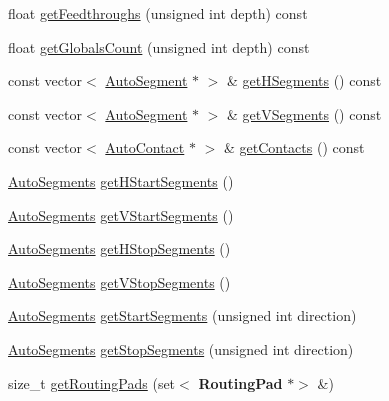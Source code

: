 \begin{DoxyCompactItemize}
float \hyperlink{classKatabatic_1_1GCell_a14feed45699c8dc406251519dc08bc79}{get\+Feedthroughs} (unsigned int depth) const
\item 
float \hyperlink{classKatabatic_1_1GCell_a4785bcc49da76fc38f6940f5b1cc5b17}{get\+Globals\+Count} (unsigned int depth) const
\item 
const vector$<$ \hyperlink{classKatabatic_1_1AutoSegment}{Auto\+Segment} $\ast$ $>$ \& \hyperlink{classKatabatic_1_1GCell_a81575302a8794958c310dc101807e9c5}{get\+H\+Segments} () const
\item 
const vector$<$ \hyperlink{classKatabatic_1_1AutoSegment}{Auto\+Segment} $\ast$ $>$ \& \hyperlink{classKatabatic_1_1GCell_ac3c357d72a24990494758dcc216e3b1e}{get\+V\+Segments} () const
\item 
const vector$<$ \hyperlink{classKatabatic_1_1AutoContact}{Auto\+Contact} $\ast$ $>$ \& \hyperlink{classKatabatic_1_1GCell_aacf50ce6dcef3a7523453725af7feeae}{get\+Contacts} () const
\item 
\hyperlink{namespaceKatabatic_a2221b0ddbc24f331809fc86f98e38041}{Auto\+Segments} \hyperlink{classKatabatic_1_1GCell_a79668a41675e9ba0ca59d4b91e3b70be}{get\+H\+Start\+Segments} ()
\item 
\hyperlink{namespaceKatabatic_a2221b0ddbc24f331809fc86f98e38041}{Auto\+Segments} \hyperlink{classKatabatic_1_1GCell_acbd17a4441905a4f5bc33a26bb338d0a}{get\+V\+Start\+Segments} ()
\item 
\hyperlink{namespaceKatabatic_a2221b0ddbc24f331809fc86f98e38041}{Auto\+Segments} \hyperlink{classKatabatic_1_1GCell_a77beccf65527a330f15bed2aba4f9dea}{get\+H\+Stop\+Segments} ()
\item 
\hyperlink{namespaceKatabatic_a2221b0ddbc24f331809fc86f98e38041}{Auto\+Segments} \hyperlink{classKatabatic_1_1GCell_a2f0f038f5700b7b55f22829c5d43aa07}{get\+V\+Stop\+Segments} ()
\item 
\hyperlink{namespaceKatabatic_a2221b0ddbc24f331809fc86f98e38041}{Auto\+Segments} \hyperlink{classKatabatic_1_1GCell_a1f92568d22b1384a8cdf328340fb9160}{get\+Start\+Segments} (unsigned int direction)
\item 
\hyperlink{namespaceKatabatic_a2221b0ddbc24f331809fc86f98e38041}{Auto\+Segments} \hyperlink{classKatabatic_1_1GCell_a80ad0f9e79bccf6aed4fb69b4b795005}{get\+Stop\+Segments} (unsigned int direction)
\item 
size\+\_\+t \hyperlink{classKatabatic_1_1GCell_a3bda8c3dbb2896a0e6e57f974d0c1cad}{get\+Routing\+Pads} (set$<$ \textbf{ Routing\+Pad} $\ast$$>$ \&)
\item 
$$
\end{DoxyCompactItemize}
